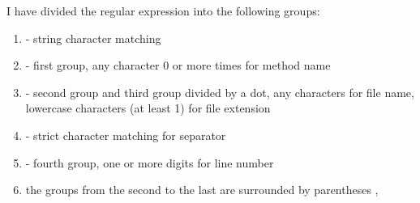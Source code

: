 \documentclass{article}
\begin{document}
I have divided the regular expression into the following groups:

\begin{enumerate}
  \item {} - string character matching
  \item {} - first group, any character 0 or more times for method name
  \item {} - second group and third group divided by a dot, any characters for file name, lowercase characters (at least 1) for file extension
  \item \codeword{:} - strict character matching for separator
  \item \codeword{([0-9]+)} - fourth group, one or more digits for line number
  \item the groups from the second to the last are surrounded by parentheses \codeword{\(}, \codeword{\)}
\end{enumerate}
\end{document}
